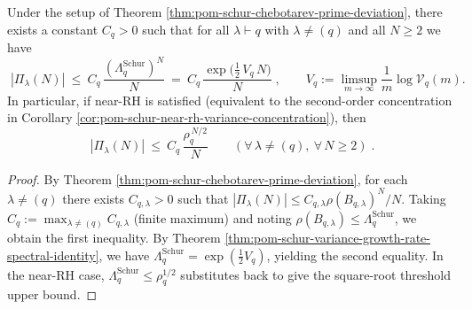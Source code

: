\begin{corollary}\label{cor:pom-schur-chebotarev-deviation-from-variance}
Under the setup of Theorem \ref{thm:pom-schur-chebotarev-prime-deviation}, there exists a constant \(C_q>0\) such that for all \(\lambda\vdash q\) with \(\lambda\neq(q)\) and all \(N\ge 2\) we have
\[
\boxed{\;
|\Pi_\lambda(N)|
\ \le\
C_q\,\frac{(\Lambda_q^{\mathrm{Schur}})^{N}}{N}
\ =\
C_q\,\frac{\exp\!\bigl(\tfrac12\,V_q\,N\bigr)}{N}\; } ,
\qquad
V_q:=\limsup_{m\to\infty}\frac{1}{m}\log\mathcal V_q(m).
\]
In particular, if near-RH is satisfied (equivalent to the second-order concentration in Corollary \ref{cor:pom-schur-near-rh-variance-concentration}), then
\[
\boxed{\;
|\Pi_\lambda(N)|
\ \le\
C_q\,\frac{\rho_q^{\,N/2}}{N}\qquad(\forall\,\lambda\neq(q),\ \forall\,N\ge2)\; } .
\]
\end{corollary}
\begin{proof}
By Theorem \ref{thm:pom-schur-chebotarev-prime-deviation}, for each \(\lambda\neq(q)\) there exists \(C_{q,\lambda}>0\) such that
\(
|\Pi_\lambda(N)|\le C_{q,\lambda}\rho(B_{q,\lambda})^N/N
\).
Taking \(C_q:=\max_{\lambda\neq(q)}C_{q,\lambda}\) (finite maximum) and noting \(\rho(B_{q,\lambda})\le \Lambda_q^{\mathrm{Schur}}\), we obtain the first inequality.
By Theorem \ref{thm:pom-schur-variance-growth-rate-spectral-identity}, we have
\(\Lambda_q^{\mathrm{Schur}}=\exp(\tfrac12 V_q)\), yielding the second equality.
In the near-RH case, \(\Lambda_q^{\mathrm{Schur}}\le \rho_q^{1/2}\) substitutes back to give the square-root threshold upper bound.
\end{proof}

